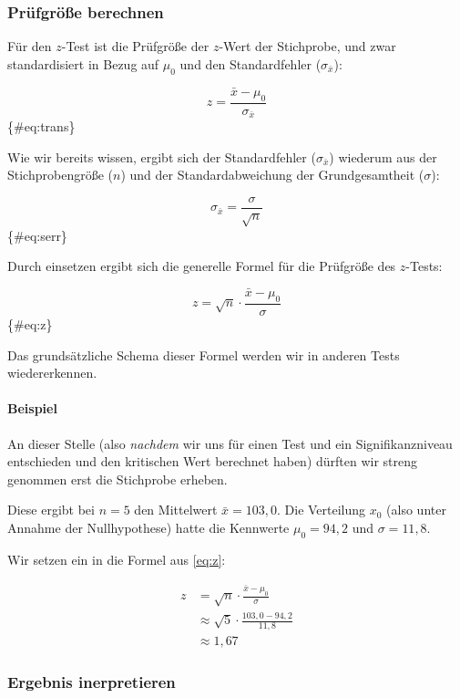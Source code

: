 \documentclass[
  ngerman,
]{article}
\begin{document}
\hypertarget{pruxfcfgruxf6uxdfe-berechnen}{%
\subsubsection{Prüfgröße berechnen}\label{pruxfcfgruxf6uxdfe-berechnen}}

Für den \(z\)-Test ist die Prüfgröße der \(z\)-Wert der Stichprobe, und zwar standardisiert in Bezug auf \(\mu_0\) und den Standardfehler (\(\sigma_{\bar{x}}\)):

\[
z=\frac{\bar{x}-\mu_0}{\sigma_{\bar{x}}}
\]\{\#eq:trans\}

Wie wir bereits wissen, ergibt sich der Standardfehler (\(\sigma_{\bar{x}}\)) wiederum aus der Stichprobengröße (\(n\)) und der Standardabweichung der Grundgesamtheit (\(\sigma\)):

\[
\sigma_{\bar{x}}=\frac{\sigma}{\sqrt{n}}
\]\{\#eq:serr\}

Durch einsetzen ergibt sich die generelle Formel für die Prüfgröße des \(z\)-Tests:

\[
z=\sqrt{n}\cdot\frac{\bar{x}-\mu_0}{\sigma}
\]\{\#eq:z\}

Das grundsätzliche Schema dieser Formel werden wir in anderen Tests wiedererkennen.

\hypertarget{beispiel-4}{%
\paragraph{Beispiel}\label{beispiel-4}}

An dieser Stelle (also \emph{nachdem} wir uns für einen Test und ein Signifikanzniveau entschieden und den kritischen Wert berechnet haben) dürften wir streng genommen erst die Stichprobe erheben.

Diese ergibt bei \(n=5\) den Mittelwert \(\bar{x}=103{,}0\). Die Verteilung \(x_0\) (also unter Annahme der Nullhypothese) hatte die Kennwerte \(\mu_0=94{,}2\) und \(\sigma=11{,}8\).

Wir setzen ein in die Formel aus \autoref{eq:z}:

\[\begin{aligned}
z&=\sqrt{n}\cdot\frac{\bar{x}-\mu_0}{\sigma}\\[4pt]
 &\approx\sqrt{5}\cdot\frac{103{,}0-94{,}2}{11{,}8}\\[4pt]
 &\approx1{,}67
\end{aligned}\]

\hypertarget{ergebnis-inerpretieren}{%
\subsubsection{Ergebnis inerpretieren}\label{ergebnis-inerpretieren}}
\end{document}
